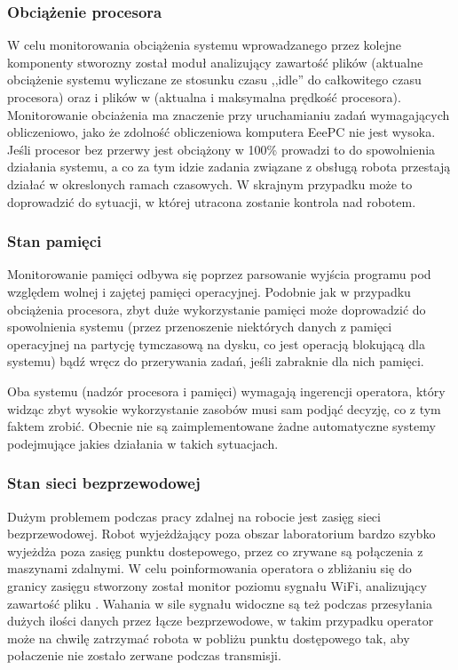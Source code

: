 \subsubsection{Obciążenie procesora}

W celu monitorowania obciążenia systemu wprowadzanego przez kolejne komponenty
stworozny został moduł analizujący zawartość plików  (aktualne
obciążenie systemu wyliczane ze stosunku czasu ,,idle'' do całkowitego czasu
procesora) oraz  i plików w 
(aktualna i maksymalna prędkość procesora). Monitorowanie obciażenia ma
znaczenie przy uruchamianiu zadań wymagających obliczeniowo, jako że zdolność
obliczeniowa komputera EeePC nie jest wysoka. Jeśli procesor bez przerwy jest
obciążony w 100\% prowadzi to do spowolnienia działania systemu, a co za tym
idzie zadania związane z obsługą robota przestają działać w okreslonych ramach
czasowych. W skrajnym przypadku może to doprowadzić do sytuacji, w której
utracona zostanie kontrola nad robotem.

\subsubsection{Stan pamięci}

Monitorowanie pamięci odbywa się poprzez parsowanie wyjścia programu 
pod względem wolnej i zajętej pamięci operacyjnej. Podobnie jak w przypadku
obciążenia procesora, zbyt duże wykorzystanie pamięci może doprowadzić do
spowolnienia systemu (przez przenoszenie niektórych danych z pamięci
operacyjnej na partycję tymczasową na dysku, co jest operacją blokującą dla
systemu) bądź wręcz do przerywania zadań, jeśli zabraknie dla nich pamięci.

Oba systemu (nadzór procesora i pamięci) wymagają ingerencji operatora, który
widząc zbyt wysokie wykorzystanie zasobów musi sam podjąć decyzję, co z tym
faktem zrobić. Obecnie nie są zaimplementowane żadne automatyczne systemy
podejmujące jakies działania w takich sytuacjach.

\subsubsection{Stan sieci bezprzewodowej}

Dużym problemem podczas pracy zdalnej na robocie jest zasięg sieci
bezprzewodowej. Robot wyjeżdżający poza obszar laboratorium bardzo szybko
wyjeżdża poza zasięg punktu dostepowego, przez co zrywane są połączenia z
maszynami zdalnymi. W celu poinformowania operatora o zbliżaniu się do granicy
zasięgu stworzony został monitor poziomu sygnału WiFi, analizujący zawartość
pliku . Wahania w sile sygnału widoczne są też podczas
przesyłania dużych ilości danych przez łącze bezprzewodowe, w takim przypadku
operator może na chwilę zatrzymać robota w pobliżu punktu dostępowego tak, aby
połaczenie nie zostało zerwane podczas transmisji. 

